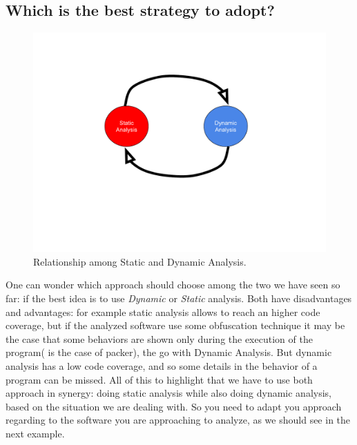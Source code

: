 \documentclass{article}
\begin{document}
\subsection{Which is the best strategy to adopt?}
\begin{figure}[htp]
    \centering
    \includegraphics[width=1\textwidth]{images/staticAndDynamic.pdf}
    \caption{Relationship among Static and Dynamic Analysis.}
    \label{fig:gdb}
\end{figure}
One can wonder which approach should choose among the two we have seen so far: if the best idea is to use \textit{Dynamic} or \textit{Static} analysis. Both have disadvantages and advantages: for example static analysis allows to reach an higher code coverage, but if the analyzed software use some obfuscation technique it may be the case that some behaviors are shown only during the execution of the program( is the case of packer\citep{packer}), the go with Dynamic Analysis.
But dynamic analysis has a low code coverage, and so some details in the behavior of a program can be missed.
All of this to highlight that we have to use both approach in synergy: doing static analysis while also doing dynamic analysis, based on the situation we are dealing with. 
So you need to adapt you approach regarding to the software you are approaching to analyze, as we should see in the next example.

\clearpage
\end{document}
